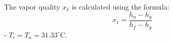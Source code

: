 The vapor quality \( x_1 \) is calculated using the formula:  
\[ x_1 = \frac{h_a - h_g}{h_f - h_g} \]  
- \( T_i = T_a = 31.33^\circ \text{C} \).